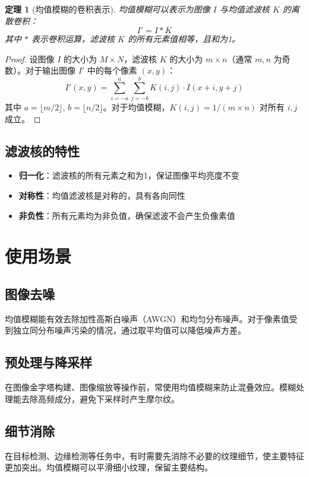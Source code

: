 \documentclass{article}
\newtheorem{theorem}{定理}[section]
\begin{document}
\begin{theorem}[均值模糊的卷积表示]
均值模糊可以表示为图像 $I$ 与均值滤波核 $K$ 的离散卷积：
\[
I' = I * K
\]
其中 $*$ 表示卷积运算，滤波核 $K$ 的所有元素值相等，且和为1。
\end{theorem}

\begin{proof}
设图像 $I$ 的大小为 $M \times N$，滤波核 $K$ 的大小为 $m \times n$（通常 $m,n$ 为奇数）。对于输出图像 $I'$ 中的每个像素 $(x,y)$：
\[
I'(x,y) = \sum_{i=-a}^{a} \sum_{j=-b}^{b} K(i,j) \cdot I(x+i, y+j)
\]
其中 $a = \lfloor m/2 \rfloor$, $b = \lfloor n/2 \rfloor$。对于均值模糊，$K(i,j) = 1/(m \times n)$ 对所有 $i,j$ 成立。
\end{proof}

\subsection{滤波核的特性}
\begin{itemize}
    \item \textbf{归一化}：滤波核的所有元素之和为1，保证图像平均亮度不变
    \item \textbf{对称性}：均值滤波核是对称的，具有各向同性
    \item \textbf{非负性}：所有元素均为非负值，确保滤波不会产生负像素值
\end{itemize}

\section{使用场景}

\subsection{图像去噪}
均值模糊能有效去除加性高斯白噪声（AWGN）和均匀分布噪声。对于像素值受到独立同分布噪声污染的情况，通过取平均值可以降低噪声方差。

\subsection{预处理与降采样}
在图像金字塔构建、图像缩放等操作前，常使用均值模糊来防止混叠效应。模糊处理能去除高频成分，避免下采样时产生摩尔纹。

\subsection{细节消除}
在目标检测、边缘检测等任务中，有时需要先消除不必要的纹理细节，使主要特征更加突出。均值模糊可以平滑细小纹理，保留主要结构。
\end{document}
